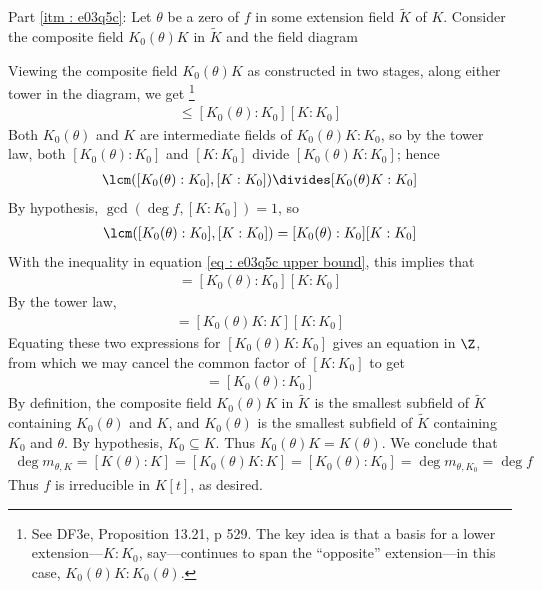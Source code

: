 {Part \ref{itm : e03q5c}: Let $\theta$ be a zero of $f$ in some extension field $\tilde{K}$ of $K$. Consider the composite field $K_{0}(\theta) K$ in $\tilde{K}$ and the field diagram
\begin{center}
\end{center}
Viewing the composite field $K_{0}(\theta) K$ as constructed in two stages, along either tower in the diagram, we get%
\footnote{See DF3e, Proposition 13.21, p 529. The key idea is that a basis for a lower extension---$K : K_{0}$, say---continues to span the ``opposite'' extension---in this case, $K_{0}(\theta) K : K_{0}(\theta)$.}%
\begin{align}
[K_{0}(\theta) K : K_{0}]
\leq
[K_{0}(\theta) : K_{0}] [K : K_{0}]%
\label{eq : e03q5c upper bound}
\end{align}
Both $K_{0}(\theta)$ and $K$ are intermediate fields of $K_{0}(\theta) K : K_{0}$, so by the tower law, both $[K_{0}(\theta) : K_{0}]$ and $[K : K_{0}]$ divide $[K_{0}(\theta) K : K_{0}]$; hence
\begin{align*}
\lcm([K_{0}(\theta) : K_{0}], [K : K_{0}])
\divides
[K_{0}(\theta) K : K_{0}]
\end{align*}
By hypothesis, $\gcd(\deg f, [K : K_{0}]) = 1$, so
\begin{align*}
\lcm([K_{0}(\theta) : K_{0}], [K : K_{0}])
=
[K_{0}(\theta) : K_{0}] [K : K_{0}]
\end{align*}
With the inequality in equation \eqref{eq : e03q5c upper bound}, this implies that
\begin{align*}
[K_{0}(\theta) K : K_{0}]
=
[K_{0}(\theta) : K_{0}] [K : K_{0}]
\end{align*}
By the tower law,
\begin{align*}
[K_{0}(\theta) K : K_{0}]
=
[K_{0}(\theta) K : K] [K : K_{0}]
\end{align*}
Equating these two expressions for $[K_{0}(\theta) K : K_{0}]$ gives an equation in $\Z$, from which we may cancel the common factor of $[K : K_{0}]$ to get
\begin{align*}
[K_{0}(\theta) K : K]
=
[K_{0}(\theta) : K_{0}]
\end{align*}
By definition, the composite field $K_{0}(\theta) K$ in $\tilde{K}$ is the smallest subfield of $\tilde{K}$ containing $K_{0}(\theta)$ and $K$, and $K_{0}(\theta)$ is the smallest subfield of $\tilde{K}$ containing $K_{0}$ and $\theta$. By hypothesis, $K_{0} \subseteq K$. Thus $K_{0}(\theta) K = K(\theta)$. We conclude that
\begin{align*}
\deg m_{\theta, K}
=
[K(\theta) : K]
=
[K_{0}(\theta) K : K]
=
[K_{0}(\theta) : K_{0}]
=
\deg m_{\theta, K_{0}}
=
\deg f
\end{align*}
Thus $f$ is irreducible in $K[t]$, as desired.}%



